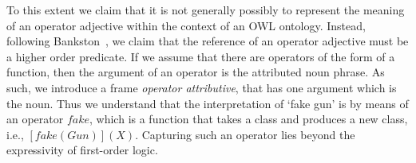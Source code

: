 \documentclass[11pt]{article}
\begin{document}
To this extent we claim that it is not generally possibly to represent the 
meaning of an operator adjective within the context of an OWL ontology.
Instead, following Bankston~\cite{bankston2003modeling}, we claim that
the reference of an operator adjective must be a higher order predicate.
If we assume that there are operators of the form of a function, then
the argument of an operator is the attributed noun phrase. As such, we introduce a frame \emph{operator attributive}, that has one argument
which is the noun. Thus we understand that the interpretation of `fake gun' is
by means of an operator $fake$, which is a function that takes a class 
and produces a new class, i.e., $[fake(Gun)](X)$. Capturing such an operator lies beyond the expressivity of first-order logic.
%
%
%
\end{document}
